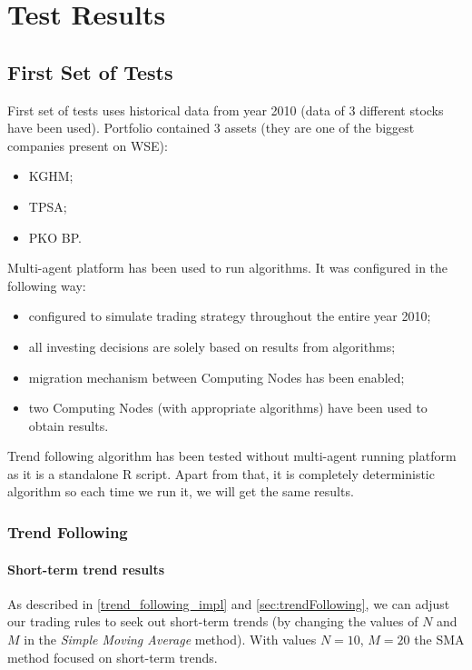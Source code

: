 \chapter{Test Results}
\label{cha:tests}

\section{First Set of Tests}
\label{sec:first_set_of_tests}

First set of tests uses historical data from year 2010 (data of 3 different stocks have been used). 
Portfolio contained 3 assets (they are one of the biggest companies present on WSE):

\begin{itemize} 
  \item KGHM;
  \item TPSA;
  \item PKO BP.
\end{itemize}

Multi-agent platform has been used to run algorithms.
It was configured in the following way: 

\begin{itemize}
  \item configured to simulate trading strategy throughout the entire year 2010;
  \item all investing decisions are solely based on results from algorithms;
  \item migration mechanism between Computing Nodes has been enabled;
  \item two Computing Nodes (with appropriate algorithms) have been used to obtain results.
\end{itemize}

Trend following algorithm has been tested without multi-agent running platform as it is a standalone R script.
Apart from that, it is completely deterministic algorithm so each time we run it, we will get the same results.

\subsection{Trend Following}

\subsubsection{Short-term trend results}
\label{short-term}

As described in \ref{trend_following_impl} and \ref{sec:trendFollowing}, we can adjust our trading rules to seek out short-term trends
 (by changing the values of $N$ and $M$ in the \emph{Simple Moving Average} method).
With values $N = 10$, $M = 20$ the SMA method focused on short-term trends.
 

